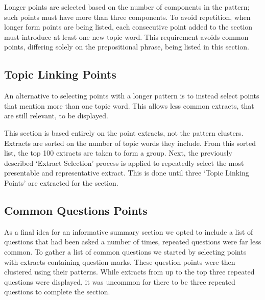      Longer points are selected based on the number of components in the pattern; such points must have more than three components. To avoid repetition, when longer form points are being listed, each consecutive point added to the section must introduce at least one new topic word. This requirement avoids common points, differing solely on the prepositional phrase, being listed in this section.

    \subsection{Topic Linking Points}
      An alternative to selecting points with a longer pattern is to instead select points that mention more than one topic word. This allows less common extracts, that are still relevant, to be displayed.

      This section is based entirely on the point extracts, not the pattern clusters. Extracts are sorted on the number of topic words they include. From this sorted list, the top 100 extracts are taken to form a group. Next, the previously described `Extract Selection' process is applied to repeatedly select the most presentable and representative extract. This is done until three `Topic Linking Points' are extracted for the section.

    \subsection{Common Questions Points}
      As a final idea for an informative summary section we opted to include a list of questions that had been asked a number of times, repeated questions were far less common. To gather a list of common questions we started by selecting points with extracts containing question marks. These question points were then clustered using their patterns. While extracts from up to the top three repeated questions were displayed, it was uncommon for there to be three repeated questions to complete the section.
